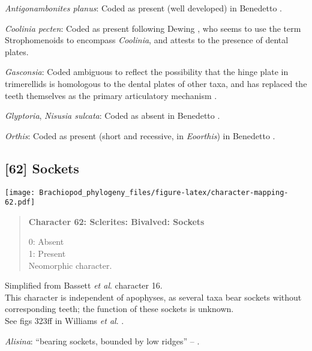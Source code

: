 \documentclass[openany]{book}
\theoremstyle{definition}
\theoremstyle{definition}
\theoremstyle{definition}
\theoremstyle{remark}
\begin{document}
\hypertarget{Antigonambonites_planus-coding-61}{}
\emph{Antigonambonites planus}: Coded as present (well developed) in
Benedetto \citeyearpar{Benedetto2009iChaniella}.

\hypertarget{Coolinia_pecten-coding-61}{}
\emph{Coolinia pecten}: Coded as present following Dewing
\citeyearpar{Dewing2001Hingemodifications}, who seems to use the term
Strophomenoids to encompass \emph{Coolinia}, and attests to the presence
of dental plates.

\hypertarget{Gasconsia-coding-61}{}
\emph{Gasconsia}: Coded ambiguous to reflect the possibility that the
hinge plate in trimerellids is homologous to the dental plates of other
taxa, and has replaced the teeth themselves as the primary articulatory
mechanism \citep[see][p.~184, for details of the
articulation]{Williams2000LinguliformeaCraniiformea}.

\hypertarget{Glyptoria-coding-61}{}
\emph{Glyptoria}, \emph{Nisusia sulcata}: Coded as absent in Benedetto
\citeyearpar{Benedetto2009iChaniella}.

\hypertarget{Orthis-coding-61}{}
\emph{Orthis}: Coded as present (short and recessive, in
\emph{Eoorthis}) in Benedetto \citeyearpar{Benedetto2009iChaniella}.

\subsection*{{[}62{]} Sockets}\label{sockets}

\texttt{[image: Brachiopod\_phylogeny\_files/figure-latex/character-mapping-62.pdf]}

\begin{quote}
\textbf{Character 62: Sclerites: Bivalved: Sockets}

0: Absent\\
1: Present\\
Neomorphic character.
\end{quote}

Simplified from Bassett \emph{et al}.
\citeyearpar{Bassett2001Functionalmorphology} character 16.\\
This character is independent of apophyses, as several taxa bear sockets
without corresponding teeth; the function of these sockets is unknown.\\
See figs 323ff in Williams \emph{et al}.
\citeyearpar{Williams1997Introduction}.

\hypertarget{Alisina-coding-62}{}
\emph{Alisina}: ``bearing sockets, bounded by low ridges'' --
\citet{Williams2000LinguliformeaCraniiformea}.
\end{document}

